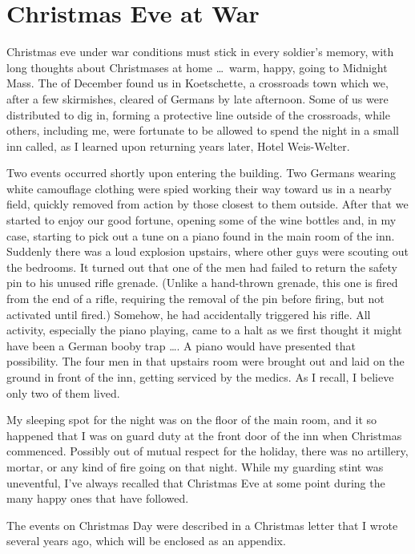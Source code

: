 \documentclass[../m3y]{subfiles}
\begin{document}
\section{Christmas Eve at War}
Christmas eve under war conditions must stick in every soldier's memory, with long thoughts about Christmases at home \ldots\ warm, happy, going to Midnight Mass. The  of December found us in Koetschette, a crossroads town which we, after a few skirmishes, cleared of Germans by late afternoon. Some of us were distributed to dig in, forming a protective line outside of the crossroads, while others, including me, were fortunate to be allowed to spend the night in a small inn called, as I learned upon returning years later, Hotel Weis-Welter.

Two events occurred shortly upon entering the building. Two Germans wearing white camouflage clothing were spied working their way toward us in a nearby field, quickly removed from action by those closest to them outside. After that we started to enjoy our good fortune, opening some of the wine bottles and, in my case, starting to pick out a tune on a piano found in the main room of the inn. Suddenly there was a loud explosion upstairs, where other guys were scouting out the bedrooms. It turned out that one of the men had failed to return the safety pin to his unused rifle grenade. (Unlike a hand-thrown grenade, this one is fired from the end of a rifle, requiring the removal of the pin before firing, but not activated until fired.) Somehow, he had accidentally triggered his rifle. All activity, especially the piano playing, came to a halt as we first thought it might have been a German booby trap \ldots. A piano would have presented that possibility. The four men in that upstairs room were brought out and laid on the ground in front of the inn, getting serviced by the medics. As I recall, I believe only two of them lived.

My sleeping spot for the night was on the floor of the main room, and it so happened that I was on guard duty at the front door of the inn when Christmas commenced. Possibly out of mutual respect for the holiday, there was no artillery, mortar, or any kind of fire going on that night. While my guarding stint was uneventful, I've always recalled that Christmas Eve at some point during the many happy ones that have followed.

The events on Christmas Day were described in a Christmas letter that I wrote several years ago, which will be enclosed as an appendix.
\end{document}
